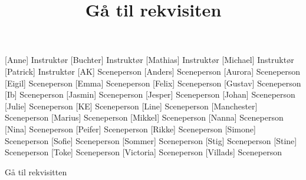 \documentclass[a4paper,11pt]{article}
\title{Gå til rekvisiten}
\author{ }
\begin{document}
\maketitle

\begin{roles}
[Anne] Instruktør
[Buchter] Instruktør
[Mathias] Instruktør
[Michael] Instruktør
[Patrick] Instruktør
[AK] Sceneperson
[Anders] Sceneperson
[Aurora] Sceneperson
[Eigil] Sceneperson
[Emma] Sceneperson
[Felix] Sceneperson
[Gustav] Sceneperson
[Ib] Sceneperson
[Jasmin] Sceneperson
[Jesper] Sceneperson
[Johan] Sceneperson
[Julie] Sceneperson
[KE] Sceneperson
[Line] Sceneperson
[Manchester] Sceneperson
[Marius] Sceneperson
[Mikkel] Sceneperson
[Nanna] Sceneperson
[Nina] Sceneperson
[Peifer] Sceneperson
[Rikke] Sceneperson
[Simone] Sceneperson
[Sofie] Sceneperson
[Sommer] Sceneperson
[Stig] Sceneperson
[Stine] Sceneperson
[Toke] Sceneperson
[Victoria] Sceneperson
[Villads] Sceneperson
\end{roles}

\begin{song}
Gå til rekvisitten
\end{song}
\end{document}
